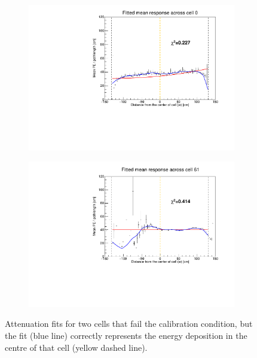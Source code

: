 \documentclass[12pt,a4paper]{article}
\begin{document}
\begin{figure}[h]
\centering
\begin{subfigure}[b]{0.495\textwidth}
\centering
\includegraphics[width=\textwidth]{Plots/ExampleCellForFBFile_3000.pdf}
\end{subfigure}
\begin{subfigure}[b]{0.495\textwidth}
\centering
\includegraphics[width=\textwidth]{Plots/ExampleCellForFBFile_61061.pdf}
\end{subfigure}
\caption{Attenuation fits for two cells that fail the calibration condition, but the fit (blue line) correctly represents the energy deposition in the centre of that cell (yellow dashed line).}
\label{figFiberBrightnessExamples}
\end{figure}
\end{document}
